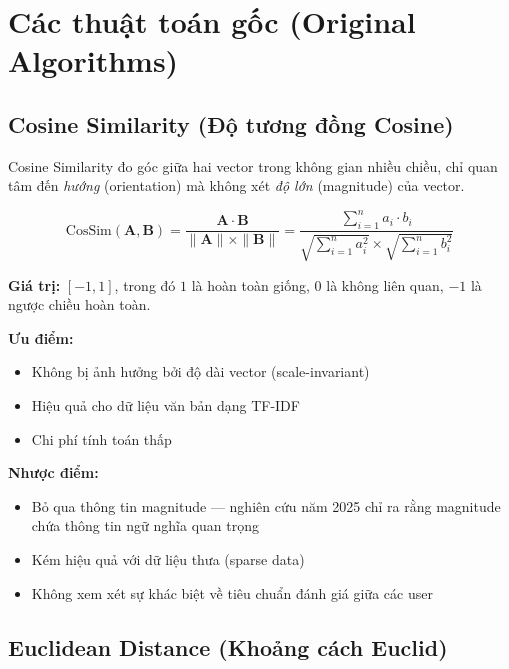 \documentclass[12pt,a4paper]{article}
\begin{document}
\section{Các thuật toán gốc (Original Algorithms)}

\subsection{Cosine Similarity (Độ tương đồng Cosine)}

Cosine Similarity đo góc giữa hai vector trong không gian nhiều chiều, chỉ quan tâm đến \textit{hướng} (orientation) mà không xét \textit{độ lớn} (magnitude) của vector.

\begin{equation}
\text{CosSim}(\mathbf{A}, \mathbf{B}) = \frac{\mathbf{A} \cdot \mathbf{B}}{\|\mathbf{A}\| \times \|\mathbf{B}\|} = \frac{\sum_{i=1}^{n} a_i \cdot b_i}{\sqrt{\sum_{i=1}^{n} a_i^2} \times \sqrt{\sum_{i=1}^{n} b_i^2}}
\label{eq:cosine}
\end{equation}

\noindent\textbf{Giá trị:} $[-1, 1]$, trong đó $1$ là hoàn toàn giống, $0$ là không liên quan, $-1$ là ngược chiều hoàn toàn.

\noindent\textbf{Ưu điểm:}
\begin{itemize}[noitemsep]
    \item Không bị ảnh hưởng bởi độ dài vector (scale-invariant)
    \item Hiệu quả cho dữ liệu văn bản dạng TF-IDF
    \item Chi phí tính toán thấp
\end{itemize}

\noindent\textbf{Nhược điểm:}
\begin{itemize}[noitemsep]
    \item Bỏ qua thông tin magnitude --- nghiên cứu năm 2025 chỉ ra rằng magnitude chứa thông tin ngữ nghĩa quan trọng \cite{magnitude2025}
    \item Kém hiệu quả với dữ liệu thưa (sparse data)
    \item Không xem xét sự khác biệt về tiêu chuẩn đánh giá giữa các user
\end{itemize}

\subsection{Euclidean Distance (Khoảng cách Euclid)}
\end{document}
